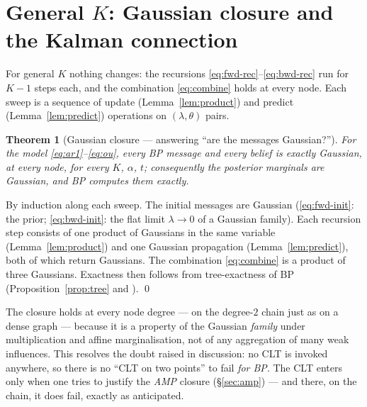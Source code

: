 \documentclass[11pt]{article}
\newtheorem{theorem}[proposition]{Theorem}
\theoremstyle{definition}
\begin{document}
\section{General $K$: Gaussian closure and the Kalman connection}\label{sec:bpK}

For general $K$ nothing changes: the recursions
\eqref{eq:fwd-rec}--\eqref{eq:bwd-rec} run for $K-1$ steps each, and the
combination \eqref{eq:combine} holds at every node. Each sweep is a sequence
of update (Lemma~\ref{lem:product}) and predict (Lemma~\ref{lem:predict})
operations on $(\lambda,\theta)$ pairs.

\begin{theorem}[Gaussian closure --- answering ``are the messages
Gaussian?'']\label{thm:closure}
For the model \eqref{eq:ar1}--\eqref{eq:ou}, every BP message and every belief
is \emph{exactly} Gaussian, at every node, for every $K$, $\alpha$, $t$;
consequently the posterior marginals are Gaussian, and BP computes them
exactly.
\end{theorem}

\begin{derivation}[\ref*{thm:closure}]
By induction along each sweep. The initial messages are Gaussian
(\eqref{eq:fwd-init}: the prior; \eqref{eq:bwd-init}: the flat limit
$\lambda\to0$ of a Gaussian family). Each recursion step consists of one
product of Gaussians in the same variable (Lemma~\ref{lem:product}) and one
Gaussian propagation (Lemma~\ref{lem:predict}), both of which return
Gaussians. The combination \eqref{eq:combine} is a product of three Gaussians.
Exactness then follows from tree-exactness of BP
(Proposition~\ref{prop:tree} and \citep[Th.~14.1]{mezard2009information}).
\qed
\end{derivation}

\begin{intuition}
The closure holds at every node degree --- on the degree-$2$ chain just as on
a dense graph --- because it is a property of the Gaussian \emph{family} under
multiplication and affine marginalisation, not of any aggregation of many
weak influences. This resolves the doubt raised in discussion: no CLT is
invoked anywhere, so there is no ``CLT on two points'' to fail \emph{for BP}.
The CLT enters only when one tries to justify the \emph{AMP} closure
(\S\ref{sec:amp}) --- and there, on the chain, it does fail, exactly as
anticipated.
\end{intuition}
\end{document}
